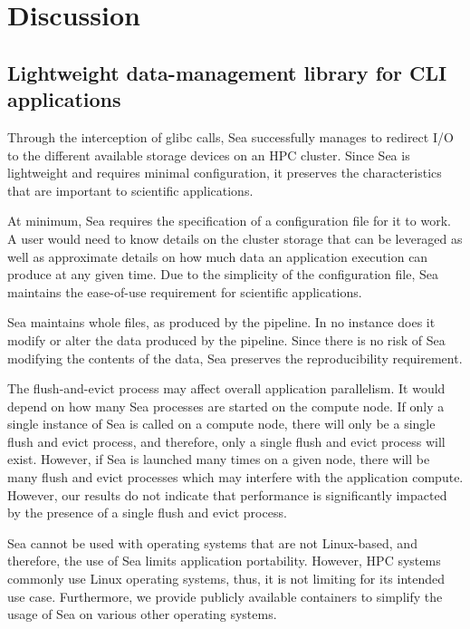 \documentclass[10pt,journal,compsoc]{IEEEtran}
\begin{document}
\section{Discussion}

    \subsection{Lightweight data-management library for CLI applications}

    Through the interception of glibc calls, Sea successfully manages to
    redirect I/O to the different available storage devices on an HPC cluster.
    Since Sea is lightweight and requires minimal configuration, it preserves
    the characteristics that are important to scientific applications.

    At minimum, Sea requires the specification of a configuration file for it to
    work. A user would need to know details on the cluster storage that can be
    leveraged as well as approximate details on how much data an application
    execution can produce at any given time. Due to the simplicity of the
    configuration file, Sea maintains the ease-of-use requirement for scientific
    applications.

    Sea maintains whole files, as produced by the pipeline. In no instance does
    it modify or alter the data produced by the pipeline. Since there is no risk
    of Sea modifying the contents of the data, Sea preserves the reproducibility
    requirement.

    The flush-and-evict process may affect overall application parallelism. It
    would depend on how many Sea processes are started on the compute node. If
    only a single instance of Sea is called on a compute node, there will only
    be a single flush and evict process, and therefore, only a single flush and
    evict process will exist. However, if Sea is launched many times on a given
    node, there will be many flush and evict processes which may interfere with
    the application compute. However, our results do not indicate that
    performance is significantly impacted by the presence of a single flush and
    evict process.  

    Sea cannot be used with operating systems
    that are not Linux-based, and therefore, the use of Sea limits application
    portability. However, HPC systems commonly use Linux operating systems,
    thus, it is not limiting for its intended use case. Furthermore, we provide
    publicly available containers to simplify the usage of Sea on various other
    operating systems.
\end{document}
